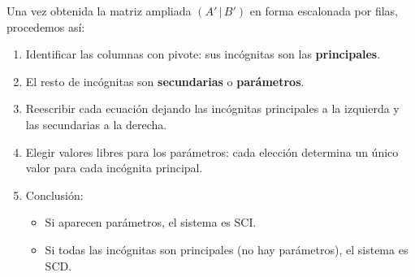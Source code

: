 \documentclass[a4paper,12pt]{article}
\begin{document}
\begin{procedimiento}[title=Cómo resolver un sistema compatible]
Una vez obtenida la matriz ampliada $(A'\,|\,B')$ en forma escalonada por filas, procedemos así:

\begin{enumerate}
    \item Identificar las columnas con pivote: sus incógnitas son las \textbf{principales}.
    \item El resto de incógnitas son \textbf{secundarias} o \textbf{parámetros}.
    \item Reescribir cada ecuación dejando las incógnitas principales a la izquierda y las secundarias a la derecha.
    \item Elegir valores libres para los parámetros: cada elección determina un único valor para cada incógnita principal.
    \item Conclusión:
    \begin{itemize}
        \item Si aparecen parámetros, el sistema es SCI.
        \item Si todas las incógnitas son principales (no hay parámetros), el sistema es SCD.
    \end{itemize}
\end{enumerate}
\end{procedimiento}
\end{document}

